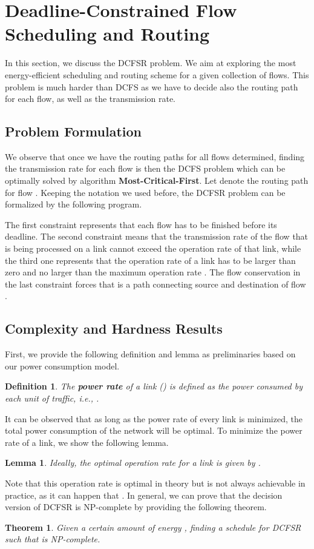 \documentclass[10pt, conference, compsocconf]{IEEEtran}
\newtheorem{theorem}{Theorem}
\newtheorem{lemma}{Lemma}
\newtheorem{definition}{Definition}
\begin{document}
\section{Deadline-Constrained Flow Scheduling and Routing}
\label{sec:dtsr}

In this section, we discuss the DCFSR problem. We aim at exploring the most energy-efficient scheduling and routing scheme for a given collection of flows. This problem is much harder than DCFS as we have to decide also the routing path for each flow, as well as the transmission rate. 

\subsection{Problem Formulation}

We observe that once we have the routing paths for all flows determined, finding the transmission rate for each flow is then the DCFS problem which can be optimally solved by algorithm \textbf{Most-Critical-First}. Let  denote the routing path for flow . Keeping the notation we used before, the DCFSR problem can be formalized by the following program.

The first constraint represents that each flow has to be finished before its deadline. The second constraint means that the transmission rate of the flow that is being processed on a link  cannot exceed the operation rate of that link, while the third one represents that the operation rate of a link has to be larger than zero and no larger than the maximum operation rate . The flow conservation in the last constraint forces that  is a path connecting source  and destination  of flow .


\subsection{Complexity and Hardness Results}

First, we provide the following definition and lemma as preliminaries based on our power consumption model. 
\begin{definition}
The \textbf{power rate} of a link  () is defined as the power consumed by each unit of traffic, i.e., .
\end{definition}
It can be observed that as long as the power rate of every link is minimized, the total power consumption of the network will be optimal. To minimize the power rate of a link, we show the following lemma.
\begin{lemma}
\label{lm:opt_rate}
Ideally, the optimal operation rate  for a link is given by .
\end{lemma}
Note that this operation rate is optimal in theory but is not always achievable in practice, as it can happen that . In general, we can prove that the decision version of DCFSR is NP-complete by providing the following theorem.
\begin{theorem}
Given a certain amount of energy , finding a schedule  for DCFSR such that  is NP-complete.
\end{theorem}
\end{document}
